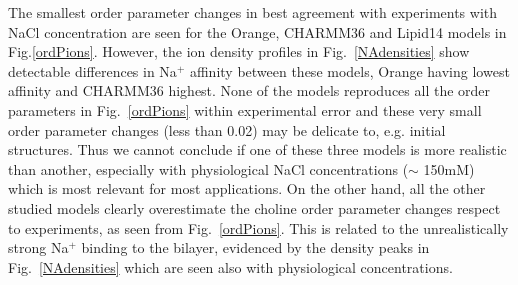 \documentclass[pre,aps,floatfix,authordate1-4,twocolumn]{revtex4-1}
\begin{document}
The smallest order parameter changes in best agreement with experiments with NaCl concentration are seen for the Orange,
CHARMM36 and Lipid14 models in Fig.\ref{ordPions}. However, the ion density profiles in Fig.~\ref{NAdensities} show 
detectable differences in Na$^+$ affinity between these models, Orange having lowest affinity and CHARMM36 highest. 
None of the models reproduces all the order parameters in Fig.~\ref{ordPions} within experimental error and 
these very small order parameter changes (less than 0.02) may be delicate to, e.g. initial structures.
Thus we cannot conclude if one of these three models is more realistic than another, especially with physiological
NaCl concentrations ($\sim$ 150mM) which is most relevant for most applications. On the other hand, all
the other studied models clearly overestimate the choline order parameter changes respect to experiments, as seen from Fig.~\ref{ordPions}.
This is related to the unrealistically strong Na$^+$ binding to the bilayer, evidenced by the density peaks 
in Fig.~\ref{NAdensities} which are seen also with physiological concentrations. 
\end{document}
